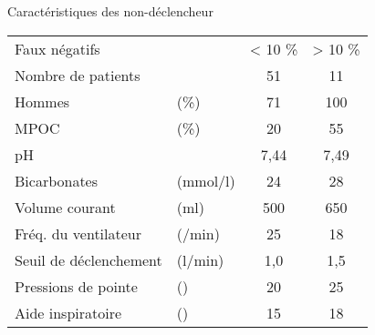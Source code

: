 \begin{frame}{Caractéristiques des non-déclencheur}
\centering
{}
	\begin{tabular}{l >{\scriptsize}l c c}
	\hline
	\rowcolor{vertchum!50}
	Faux négatifs          &          & < 10 \% & > 10 \% \\
	\rowcolor{vertchum!50}
	Nombre de patients     &          & 51      & 11 \\
	\hline
	Hommes                 & (\%)     & 71      & 100 \\
	MPOC                   & (\%)     & 20      & 55 \\
	pH                     &          & 7,44    & 7,49\\
	Bicarbonates           & (mmol/l) & 24      & 28 \\
		Volume courant       & (ml)     & 500     & 650 \\
	Fréq. du ventilateur   & (/min)   & 25      & 18 \\
	Seuil de déclenchement & (l/min)  & 1,0     & 1,5 \\
	Pressions de pointe    & (\cmh)   & 20      & 25 \\
	Aide inspiratoire      & (\cmh)   & 15      & 18\\
	\hline
\end{tabular}


\end{frame}

